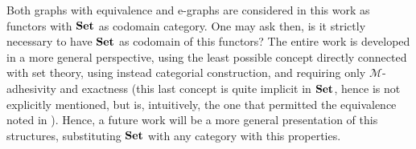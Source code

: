 Both graphs with equivalence and e-graphs are considered in this work as functors with $\mathbf{Set}$ as codomain category.
One may ask then, is it strictly necessary to have $\mathbf{Set}$ as codomain of this functors?
The entire work is developed in a more general perspective, using the least possible concept directly connected with set theory, using instead categorial construction, and requiring only $\mathcal{M}$-adhesivity and exactness (this last concept is quite implicit in $\mathbf{Set}$, hence is not explicitly mentioned, but is, intuitively, the one that permitted the equivalence noted in ).
Hence, a future work will be a more general presentation of this structures, substituting $\mathbf{Set}$ with any category with this properties.


